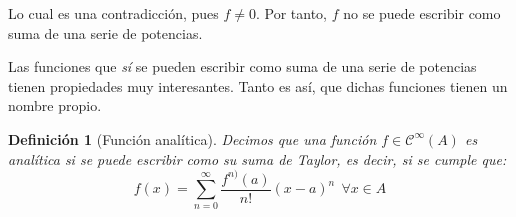 \documentclass[11pt, a4paper]{article}
\theoremstyle{theorem-style}
\theoremstyle{definition-style}
\newtheorem*{ndef}{Definición}
\theoremstyle{remark-style}
\theoremstyle{example-style}
\begin{document}
Lo cual es una contradicción, pues $f\ne 0$. Por tanto, $f$ no se puede escribir como suma de una serie de potencias.

Las funciones que \textit{sí} se pueden escribir como suma de una serie de potencias tienen propiedades muy interesantes. Tanto es así, que dichas funciones tienen un nombre propio.

\begin{ndef}[Función analítica] Decimos que una función $f \in \mathcal{C}^{\infty}(A)$ es analítica si se puede escribir como su suma de Taylor, es decir, si se cumple que: $$f(x) = \sum_{n=0}^{\infty} \frac{f^{n)}(a)}{n!}(x-a)^n\ \ \forall x \in A$$
\end{ndef}
\end{document}
